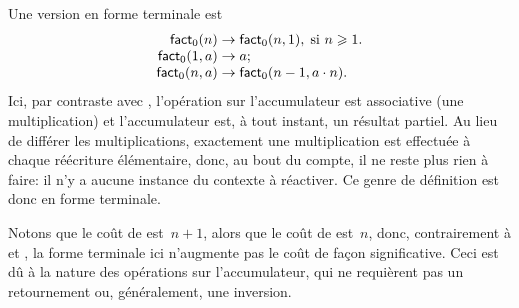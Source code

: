 Une version en forme terminale
 est
\begin{equation*}
\begin{array}{r@{\;}c@{\;}l}
\fun{fact}_0(n) & \rightarrow & \fun{fact}_0(n,1),
\;\text{si \(n \geqslant 1\)}.\\
\fun{fact}_0(1,a) & \rightarrow & a;\\
\fun{fact}_0(n,a) & \rightarrow & \fun{fact}_0(n-1,a \cdot n).
\end{array}
\end{equation*}
Ici, par contraste avec , l'opération sur l'accumulateur
est associative (une multiplication) et l'accumulateur est, à tout
instant, un résultat partiel. Au lieu de différer les multiplications,
exactement une multiplication est effectuée à chaque réécriture
élémentaire, donc, au bout du compte, il ne reste plus rien à faire:
il n'y a aucune instance du contexte à réactiver. Ce genre de
définition est donc en forme terminale.

Notons que le coût de  est~\(n+1\), alors que le
coût de  est~\(n\), donc, contrairement à
 et , la forme terminale ici n'augmente
pas le coût de façon significative. Ceci est dû à la nature des
opérations sur l'accumulateur, qui ne requièrent pas un retournement
ou, généralement, une inversion.

